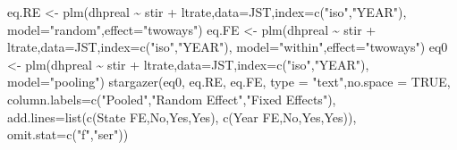 \documentclass[
  12pt,
]{book}
\newenvironment{Shaded}{\begin{snugshade}}{\end{snugshade}}
\newcommand{\AttributeTok}[1]{\textcolor[rgb]{0.77,0.63,0.00}{#1}}
\newcommand{\ConstantTok}[1]{\textcolor[rgb]{0.00,0.00,0.00}{#1}}
\newcommand{\FunctionTok}[1]{\textcolor[rgb]{0.00,0.00,0.00}{#1}}
\newcommand{\NormalTok}[1]{#1}
\newcommand{\OtherTok}[1]{\textcolor[rgb]{0.56,0.35,0.01}{#1}}
\newcommand{\SpecialCharTok}[1]{\textcolor[rgb]{0.00,0.00,0.00}{#1}}
\newcommand{\StringTok}[1]{\textcolor[rgb]{0.31,0.60,0.02}{#1}}
\theoremstyle{definition}
\theoremstyle{definition}
\theoremstyle{definition}
\theoremstyle{definition}
\theoremstyle{remark}
\begin{document}
\begin{Shaded}
\begin{Highlighting}[]
\NormalTok{eq.RE }\OtherTok{\textless{}{-}} \FunctionTok{plm}\NormalTok{(dhpreal }\SpecialCharTok{\textasciitilde{}}\NormalTok{ stir }\SpecialCharTok{+}\NormalTok{ ltrate,}\AttributeTok{data=}\NormalTok{JST,}\AttributeTok{index=}\FunctionTok{c}\NormalTok{(}\StringTok{"iso"}\NormalTok{,}\StringTok{"YEAR"}\NormalTok{),}
             \AttributeTok{model=}\StringTok{"random"}\NormalTok{,}\AttributeTok{effect=}\StringTok{"twoways"}\NormalTok{)}
\NormalTok{eq.FE }\OtherTok{\textless{}{-}} \FunctionTok{plm}\NormalTok{(dhpreal }\SpecialCharTok{\textasciitilde{}}\NormalTok{ stir }\SpecialCharTok{+}\NormalTok{ ltrate,}\AttributeTok{data=}\NormalTok{JST,}\AttributeTok{index=}\FunctionTok{c}\NormalTok{(}\StringTok{"iso"}\NormalTok{,}\StringTok{"YEAR"}\NormalTok{),}
             \AttributeTok{model=}\StringTok{"within"}\NormalTok{,}\AttributeTok{effect=}\StringTok{"twoways"}\NormalTok{)}
\NormalTok{eq0   }\OtherTok{\textless{}{-}} \FunctionTok{plm}\NormalTok{(dhpreal }\SpecialCharTok{\textasciitilde{}}\NormalTok{ stir }\SpecialCharTok{+}\NormalTok{ ltrate,}\AttributeTok{data=}\NormalTok{JST,}\AttributeTok{index=}\FunctionTok{c}\NormalTok{(}\StringTok{"iso"}\NormalTok{,}\StringTok{"YEAR"}\NormalTok{),}
             \AttributeTok{model=}\StringTok{"pooling"}\NormalTok{) }
\FunctionTok{stargazer}\NormalTok{(eq0, eq.RE, eq.FE, }\AttributeTok{type =} \StringTok{"text"}\NormalTok{,}\AttributeTok{no.space =} \ConstantTok{TRUE}\NormalTok{,}
                     \AttributeTok{column.labels=}\FunctionTok{c}\NormalTok{(}\StringTok{"Pooled"}\NormalTok{,}\StringTok{"Random Effect"}\NormalTok{,}\StringTok{"Fixed Effects"}\NormalTok{),}
                     \AttributeTok{add.lines=}\FunctionTok{list}\NormalTok{(}\FunctionTok{c}\NormalTok{(}\StringTok{\textquotesingle{}State FE\textquotesingle{}}\NormalTok{,}\StringTok{\textquotesingle{}No\textquotesingle{}}\NormalTok{,}\StringTok{\textquotesingle{}Yes\textquotesingle{}}\NormalTok{,}\StringTok{\textquotesingle{}Yes\textquotesingle{}}\NormalTok{),}
                                    \FunctionTok{c}\NormalTok{(}\StringTok{\textquotesingle{}Year FE\textquotesingle{}}\NormalTok{,}\StringTok{\textquotesingle{}No\textquotesingle{}}\NormalTok{,}\StringTok{\textquotesingle{}Yes\textquotesingle{}}\NormalTok{,}\StringTok{\textquotesingle{}Yes\textquotesingle{}}\NormalTok{)),}
                     \AttributeTok{omit.stat=}\FunctionTok{c}\NormalTok{(}\StringTok{"f"}\NormalTok{,}\StringTok{"ser"}\NormalTok{))}
\end{Highlighting}
\end{Shaded}
\end{document}
